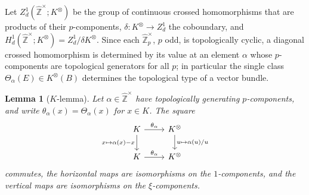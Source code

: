 \documentclass[11pt]{amsart}
\theoremstyle{plain}
\newtheorem{lemma}[theorem]{Lemma}
\theoremstyle{definition}
\numberwithin{equation}{section}
\newcommand{\Zhat}{\widehat{\mathbb{Z}}}
\newcommand{\units}{^{\times}}
\begin{document}
Let $Z^1_d(\Zhat\units;K^\otimes)$ be the group of continuous crossed homomorphisms that are products of their $p$-components, $\delta\colon K^\otimes\to Z^1_d$ the coboundary, and $H^1_d(\Zhat\units;K^\otimes)=Z^1_d/\delta K^\otimes$.
Since each $\Zhat_p\units$, $p$ odd, is topologically cyclic, a diagonal crossed homomorphism is determined by its value at an element $\alpha$ whose $p$-components are topological generators for all $p$; in particular the single class $\Theta_\alpha(E)\in K^\otimes(B)$ determines the topological type of a vector bundle.

\begin{lemma}[$K$-lemma]\label{lem:Klemma}
Let $\alpha\in\Zhat\units$ have topologically generating $p$-components, and write $\theta_\alpha(x)=\Theta_\alpha(x)$ for $x\in K$.
The square
\[
\begin{tikzcd}
K\arrow[r,"\theta_\alpha"]\arrow[d,"x\mapsto\alpha(x)-x"'] & K^\otimes\arrow[d,"u\mapsto\alpha(u)/u"]\\
K\arrow[r,"\theta_\alpha"] & K^\otimes
\end{tikzcd}
\]
commutes, the horizontal maps are isomorphisms on the $1$-components, and the vertical maps are isomorphisms on the $\xi$-components.
\end{lemma}
\end{document}
